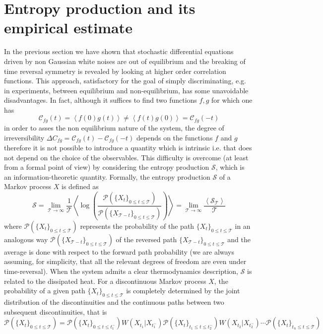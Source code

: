 \documentclass[12pt]{iopart}
\newcommand{\lx} {\left}
\newcommand{\rx} {\right}
\newcommand{\ave}[1] {\lx\langle #1 \rx\rangle}
\newcommand{\cP} {\mathcal{P}}
\newcommand{\cS} {\mathcal{S}}
\newcommand{\cC} {\mathcal{C}}
\newcommand{\cT} {\mathcal{T}}
\begin{document}
\section{Entropy production and its empirical estimate}
\label{sec:ep}
In the previous section we have shown that stochastic differential equations driven by non Gaussian white noises are out of equilibrium and the breaking of time reversal symmetry is revealed by looking at higher order correlation functions. This approach, satisfactory for the goal of simply discriminating, e.g. in experiments, between equilibrium and non-equilibrium, has some unavoidable disadvantages. In fact, although it suffices to find two functions $f,g$ for which one has \begin{equation}
\cC_{fg}(t)=\ave{f(0)g(t)}\neq \ave{f(t)g(0)}=\cC_{fg}(-t)
\end{equation}
in order to asses the non equilibrium nature of the system, the degree of irreversibility $\Delta C_{fg}=\cC_{fg}(t)-\cC_{fg}(-t)$ depends on the functions $f$ and $g$ therefore it is not possible to introduce a quantity which is intrinsic i.e. that does not depend on the choice of the observables. This difficulty is overcome (at least from a formal point of view) by considering the entropy production $\cS$, which is an information-theoretic quantity. Formally, the entropy production $\cS$ of a Markov process $X$ is defined as 
\begin{equation}
    \cS=\lim_{\cT\to\infty}\frac{1}{\cT}\ave{\log\lx(\frac{\cP(\{X_t\}_{0\le t \le \cT})}{\cP(\{ X_{\cT - t}\}_{0 \le t \le \cT})}\rx)}=\lim_{\cT\to\infty} \frac{\ave{\cS_\cT}}{\cT}
    \label{eq:epr}
\end{equation}
where $\cP(\{X_t\}_{0\le t \le \cT})$ represents the probability of the path $\{X_t\}_{0\le t \le \cT}$ in an analogous way $\cP(\{ X_{\cT - t}\}_{0 \le t \le \cT})$ of the reversed path $\{ X_{\cT - t}\}_{0 \le t \le \cT}$ and the average is done with respect to the forward path probability (we are always assuming, for simplicity, that all the relevant degrees of freedom are even under time-reversal). When the system admits a clear thermodynamics description, $\cS$ is related to the dissipated heat. For a discontinuous Markov process $X$, the probability of a given path $\{X_t\}_{0\le t \le \cT}$ is completely determined by the joint distribution of the discontinuities and the continuous paths between two subsequent discontinuities, that is
\begin{equation}
\cP(\{X_t\}_{0\le t \le \cT})=\cP(\{X_t\}_{0\le t \le t_1^{-}})W\lx(X_{t_1}|X_{t_1^-}\rx)\cP(\{X_t\}_{t_1\le t \le t_2^{-}})W\lx(X_{t_2}|X_{t_2^{-}}\rx)\cdots \cP(\{X_t\}_{t_n\le t \le \cT})
\label{eq:path_probability}
\end{equation}
\end{document}
